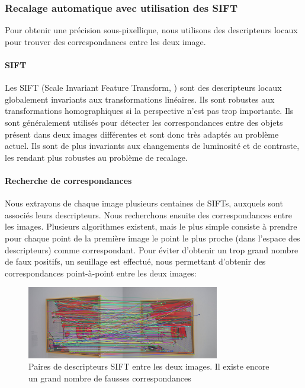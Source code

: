 \documentclass[12pt,a4paper]{article}
\begin{document}
\subsubsection{Recalage automatique avec utilisation des SIFT}

Pour obtenir une précision sous-pixellique, nous utilisons des descripteurs locaux pour trouver des correspondances entre les deux image.

\paragraph{SIFT}
Les SIFT (Scale Invariant Feature Transform, \citep{lowe1999object}) sont des descripteurs locaux globalement invariants aux transformations linéaires. Ils sont robustes aux transformations homographiques si la perspective n'est pas trop importante. Ils sont généralement utilisés pour détecter les correspondances entre des objets présent dans deux images différentes et sont donc très adaptés au problème actuel. Ils sont de plus invariants aux changements de luminosité et de contraste, les rendant plus robustes au problème de recalage.

\paragraph{Recherche de correspondances}
Nous extrayons de chaque image plusieurs centaines de SIFTs, auxquels sont associés leurs descripteurs. Nous recherchons ensuite des correspondances entre les images. Plusieurs algorithmes existent, mais le plus simple consiste à prendre pour chaque point de la première image le point le plus proche (dans l'espace des descripteurs) comme correspondant. Pour éviter d'obtenir un trop grand nombre de faux positifs, un seuillage est effectué, nous permettant d'obtenir des correspondances point-à-point entre les deux images:

\begin{figure}[H]
  \centering
  \includegraphics[width=0.75\textwidth]{Fig/sift_raw.png}
  \caption{Paires de descripteurs SIFT entre les deux images. Il existe encore un grand nombre de fausses correspondances}
\end{figure}
\end{document}

